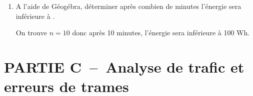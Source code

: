 \begin{enumerate}[series=monDS, resume]
\begin{minipage}{0.44\textwidth}
    \end{minipage}\hfill{}
    \begin{minipage}{0.48\textwidth}
\begin{tcblisting}{%
  listing only,
  colback=white, 
  colupper=black, 
  title=Algorithme de recherche de seuil,
  boxsep=0pt,
  left=5mm,
  listing options={
    numbers=none,
    basicstyle=\ttfamily,
    escapeinside={(*}{*)},
    literate={<-}{{$\bm{\leftarrow}$}}2, %
    frame=none %
    }
}
n <- 0
u <- 120
tant que (**):
        u <- (**)
        n <- (**)
afficher (n)
\end{tcblisting}
    \end{minipage}

    

\medskip

\item A l'aide de Géogébra, déterminer après combien de minutes l'énergie sera inférieure à .
\begin{blocvisiblex}[height=1]
{\quad}
On trouve $n=10$ donc après 10 minutes, l'énergie sera inférieure à 100 Wh.
\end{blocvisiblex}

\appelprof{}
\end{enumerate}

\pagebreak

\section*{PARTIE C~--~Analyse de trafic et erreurs de trames}


\medskip

